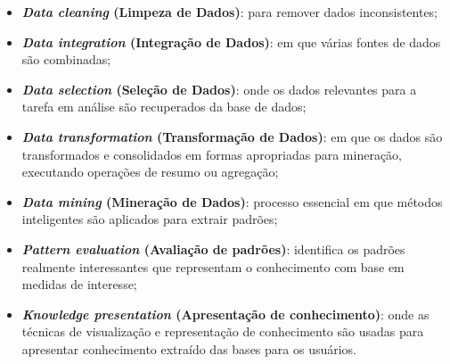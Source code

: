 \begin{itemize}
    \item \textbf{\textit{Data cleaning} (Limpeza de Dados)}: para remover dados inconsistentes;

    \item \textbf{\textit{Data integration} (Integração de Dados)}: em que várias fontes de dados são combinadas;

    \item \textbf{\textit{Data selection} (Seleção de Dados)}: onde os dados relevantes para a tarefa em análise são recuperados da base de dados;

    \item \textbf{\textit{Data transformation} (Transformação de Dados)}: em que os dados são transformados e consolidados em formas apropriadas para mineração, executando operações de resumo ou agregação;

    \item \textbf{\textit{Data mining} (Mineração de Dados)}: processo essencial em que métodos inteligentes são aplicados para extrair padrões;

    \item \textbf{\textit{Pattern evaluation} (Avaliação de padrões)}: identifica os padrões realmente interessantes que representam o conhecimento com base em medidas de interesse;

    \item \textbf{\textit{Knowledge presentation} (Apresentação de conhecimento)}: onde as técnicas de visualização e representação de conhecimento são usadas para apresentar conhecimento extraído das bases para os usuários.

\end{itemize}

